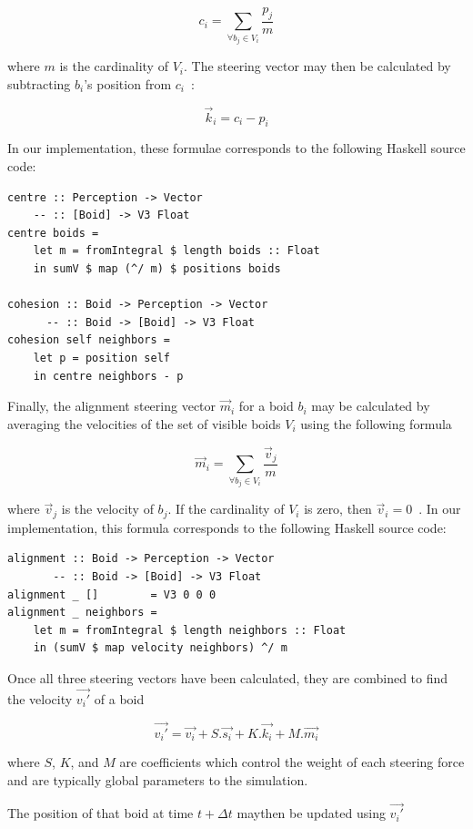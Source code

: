 \[ c_i = \sum\limits_{\forall b_j \in V_i} \frac{p_j}{m} \]

where $m$ is the cardinality of $V_i$. The steering vector may then be calculated by subtracting $b_i$'s position from $c_i$~\cite{hartman2006autonomous}:

\[ \vec{k}_i = c_i - p_i \]

In our implementation, these formulae corresponds to the following Haskell source code:

\begin{verbatim}
centre :: Perception -> Vector
    -- :: [Boid] -> V3 Float
centre boids =
    let m = fromIntegral $ length boids :: Float
    in sumV $ map (^/ m) $ positions boids

cohesion :: Boid -> Perception -> Vector
      -- :: Boid -> [Boid] -> V3 Float
cohesion self neighbors =
    let p = position self
    in centre neighbors - p
\end{verbatim}

Finally, the alignment steering vector $\vec{m}_i$ for a boid $b_i$ may be calculated by averaging the velocities of the set of visible boids $V_i$ using the following formula

\[ \vec{m}_i = \sum\limits_{\forall b_j \in V_i} \frac{\vec{v}_j}{m} \]

where $\vec{v}_j$ is the velocity of $b_j$. If the cardinality of $V_i$ is zero, then $\vec{v}_i = 0$~\cite{hartman2006autonomous}. In our implementation, this formula corresponds to the following Haskell source code:

\begin{verbatim}
alignment :: Boid -> Perception -> Vector
       -- :: Boid -> [Boid] -> V3 Float
alignment _ []        = V3 0 0 0
alignment _ neighbors =
    let m = fromIntegral $ length neighbors :: Float
    in (sumV $ map velocity neighbors) ^/ m
\end{verbatim}

Once all three steering vectors have been calculated, they are combined to find the velocity $\vec{v_i\prime}$ of a boid

\[ \vec{v_i\prime} = \vec{v_i} + S.\vec{s_i} + K.\vec{k_i} + M.\vec{m_i} \]

where $S$, $K$, and $M$ are coefficients which control the weight of each steering force and are typically global parameters to the simulation.

The position of that boid at time $t + \Delta t$ maythen  be updated using $\vec{v_i\prime}$

